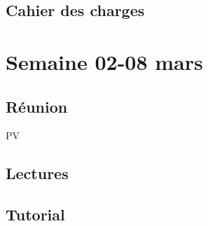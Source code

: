 \documentclass[a4paper,11pt]{report}
\begin{document}
\subsection{Cahier des charges}

\section{Semaine 02-08 mars}
\subsection{Réunion}
\todo PV

\subsection{Lectures}

\subsection{Tutorial}
\end{document}
